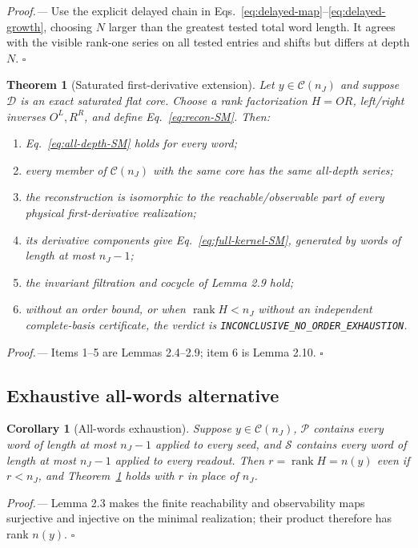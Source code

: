 \documentclass[aps,prl,reprint,superscriptaddress,nofootinbib]{revtex4-2}
\newcommand{\rank}{\operatorname{rank}}
\newcommand{\cP}{\mathcal P}
\newcommand{\cS}{\mathcal S}
\newcommand{\cC}{\mathcal C}
\newcommand{\cD}{\mathcal D}
\newtheorem{theorem}{Theorem}
\newtheorem{corollary}{Corollary}
\begin{document}
\emph{Proof.---}
Use the explicit delayed chain in Eqs.~\eqref{eq:delayed-map}--\eqref{eq:delayed-growth}, choosing $N$ larger than the greatest tested total word length.  It agrees with the visible rank-one series on all tested entries and shifts but differs at depth $N$. \hfill$\square$

\begin{theorem}[Saturated first-derivative extension]
\label{thm:flat-extension}
Let $y\in\cC(n_J)$ and suppose $\cD$ is an exact saturated flat core.  Choose a rank factorization $H=OR$, left/right inverses $O^L,R^R$, and define Eq.~\eqref{eq:recon-SM}.  Then:
\begin{enumerate}
\item Eq.~\eqref{eq:all-depth-SM} holds for every word;
\item every member of $\cC(n_J)$ with the same core has the same all-depth series;
\item the reconstruction is isomorphic to the reachable/observable part of every physical first-derivative realization;
\item its derivative components give Eq.~\eqref{eq:full-kernel-SM}, generated by words of length at most $n_J-1$;
\item the invariant filtration and cocycle of Lemma 2.9 hold;
\item without an order bound, or when $\rank H<n_J$ without an independent complete-basis certificate, the verdict is \texttt{INCONCLUSIVE\_NO\_ORDER\_EXHAUSTION}.
\end{enumerate}
\end{theorem}

\emph{Proof.---}
Items 1--5 are Lemmas 2.4--2.9; item 6 is Lemma 2.10. \hfill$\square$

\subsection{Exhaustive all-words alternative}

\begin{corollary}[All-words exhaustion]
\label{cor:exhaustive}
Suppose $y\in\cC(n_J)$, $\cP$ contains every word of length at most $n_J-1$ applied to every seed, and $\cS$ contains every word of length at most $n_J-1$ applied to every readout.  Then $r=\rank H=n(y)$ even if $r<n_J$, and Theorem~\ref{thm:flat-extension} holds with $r$ in place of $n_J$.
\end{corollary}

\emph{Proof.---}
Lemma 2.3 makes the finite reachability and observability maps surjective and injective on the minimal realization; their product therefore has rank $n(y)$. \hfill$\square$
\end{document}
